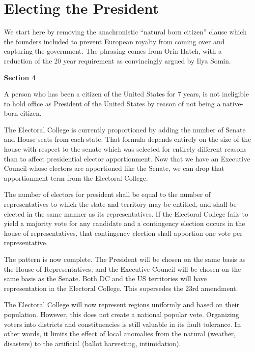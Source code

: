 \documentclass{article}
\newcommand{\quotes}[1]{``#1''}
\begin{document}
\section{Electing the President}

We start here by removing the anachronistic \quotes{natural born citizen} clause which the founders included to prevent European royalty from coming over and capturing the government. The phrasing comes from Orin Hatch\cite{Somin_Hatch}, with a reduction of the 20 year requirement as convincingly argued by Ilya Somin\cite{Somin_NBC}.

\begin{quoting}
\textbf{Section 4}

A person who has been a citizen of the United States for 7 years, is not ineligible to hold office as President of the United States by reason of not being a native-born citizen.
\end{quoting}

The Electoral College is currently proportioned by adding the number of Senate and House seats from each state. That formula depends entirely on the size of the house with respect to the senate which was selected for entirely different reasons than to affect presidential elector apportionment. Now that we have an Executive Council whose electors are apportioned like the Senate, we can drop that apportionment term from the Electoral College.

\begin{quoting}
The number of electors for president shall be equal to the number of representatives to which the state and territory may be entitled, and shall be elected in the same manner as its representatives. If the Electoral College fails to yield a majority vote for any candidate and a contingency election occurs in the house of representatives, that contingency election shall apportion one vote per representative.
\end{quoting}

The pattern is now complete. The President will be chosen on the same basis as the House of Representatives, and the Executive Council will be chosen on the same basis as the Senate. Both DC and the US territories will have representation in the Electoral College. This supersedes the 23rd amendment.

The Electoral College will now represent regions uniformly and based on their population. However, this does not create a national popular vote. Organizing voters into districts and constituencies is still valuable in its fault tolerance. In other words, it limits the effect of local anomalies from the natural (weather, disasters) to the artificial (ballot harvesting, intimidation).
\end{document}
